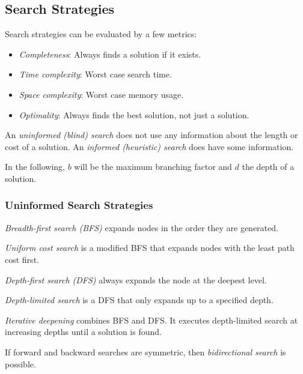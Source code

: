 \documentclass[english]{panikzettel}
\begin{document}
\newpage
\subsection{Search Strategies}

Search strategies can be evaluated by a few metrics:
\begin{itemize}
    \item \emph{Completeness}: Always finds a solution if it exists.
    \item \emph{Time complexity}: Worst case search time.
    \item \emph{Space complexity}: Worst case memory usage.
    \item \emph{Optimality}: Always finds the best solution, not just a solution.
\end{itemize}

An \emph{uninformed (blind) search} does not use any information about the length or cost of a solution.
An \emph{informed (heuristic) search} does have some information.

In the following, $b$ will be the maximum branching factor and $d$ the depth of a solution.

\subsubsection{Uninformed Search Strategies}

\emph{Breadth-first search (BFS)} expands nodes in the order they are generated.

\emph{Uniform cost search} is a modified BFS that expands nodes with the least path cost first.

\emph{Depth-first search (DFS)} always expands the node at the deepest level.

\emph{Depth-limited search} is a DFS that only expands up to a specified depth.

\emph{Iterative deepening} combines BFS and DFS. It executes depth-limited search at increasing depths until a solution is found.

If forward and backward searches are symmetric, then \emph{bidirectional search} is possible.
\end{document}
